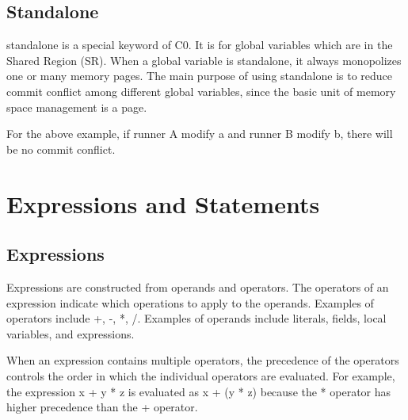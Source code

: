 \documentclass[a4paper]{article}
\begin{document}
{\subsection{Standalone}}
standalone is a special keyword of C0. It is for global variables which are in the Shared Region (SR). When a global variable is standalone, it always monopolizes one or many memory pages. The main purpose of using standalone is to reduce commit conflict among different global variables, since the basic unit of memory space management is a page.

{\color{blue}{}}

For the above example, if runner A modify a and runner B modify b, there will be no commit conflict.

{\section{Expressions and Statements}}

{\subsection{Expressions}}

Expressions are constructed from operands and operators. The operators of an expression indicate which operations to apply to the operands. Examples of operators include +, -, *, /. Examples of operands include literals, fields, local variables, and expressions.

When an expression contains multiple operators, the precedence of the operators controls the order in which the individual operators are evaluated. For example, the expression x + y * z is evaluated as x + (y * z) because the * operator has higher precedence than the + operator.
\end{document}
